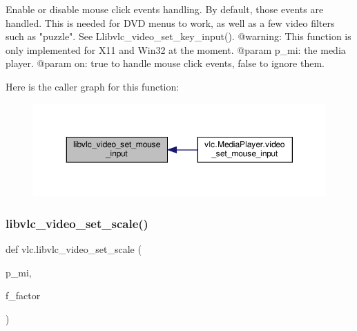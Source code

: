 \begin{DoxyVerb}Enable or disable mouse click events handling. By default, those events are
handled. This is needed for DVD menus to work, as well as a few video
filters such as "puzzle".
See L{libvlc_video_set_key_input}().
@warning: This function is only implemented for X11 and Win32 at the moment.
@param p_mi: the media player.
@param on: true to handle mouse click events, false to ignore them.
\end{DoxyVerb}
 Here is the caller graph for this function\+:
\nopagebreak
\begin{figure}[H]
\begin{center}
\leavevmode
\includegraphics[width=350pt]{namespacevlc_a441b6e87f5bb7c378d9c47250ab21607_icgraph}
\end{center}
\end{figure}
\mbox{\label{namespacevlc_afd16d3990030b2fa33195d13e9c0bb27}} 
\subsubsection{\texorpdfstring{libvlc\+\_\+video\+\_\+set\+\_\+scale()}{libvlc\_video\_set\_scale()}}
{\footnotesize\ttfamily def vlc.\+libvlc\+\_\+video\+\_\+set\+\_\+scale (\begin{DoxyParamCaption}\item[{}]{p\+\_\+mi,  }\item[{}]{f\+\_\+factor }\end{DoxyParamCaption})}

